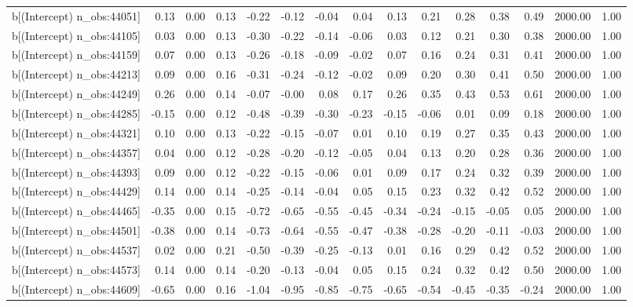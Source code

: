 \begin{table}[ht]
\begin{tabular}{rrrrrrrrrrrrrrr}
  b[(Intercept) n\_obs:44051] & 0.13 & 0.00 & 0.13 & -0.22 & -0.12 & -0.04 & 0.04 & 0.13 & 0.21 & 0.28 & 0.38 & 0.49 & 2000.00 & 1.00 \\ 
  b[(Intercept) n\_obs:44105] & 0.03 & 0.00 & 0.13 & -0.30 & -0.22 & -0.14 & -0.06 & 0.03 & 0.12 & 0.21 & 0.30 & 0.38 & 2000.00 & 1.00 \\ 
  b[(Intercept) n\_obs:44159] & 0.07 & 0.00 & 0.13 & -0.26 & -0.18 & -0.09 & -0.02 & 0.07 & 0.16 & 0.24 & 0.31 & 0.41 & 2000.00 & 1.00 \\ 
  b[(Intercept) n\_obs:44213] & 0.09 & 0.00 & 0.16 & -0.31 & -0.24 & -0.12 & -0.02 & 0.09 & 0.20 & 0.30 & 0.41 & 0.50 & 2000.00 & 1.00 \\ 
  b[(Intercept) n\_obs:44249] & 0.26 & 0.00 & 0.14 & -0.07 & -0.00 & 0.08 & 0.17 & 0.26 & 0.35 & 0.43 & 0.53 & 0.61 & 2000.00 & 1.00 \\ 
  b[(Intercept) n\_obs:44285] & -0.15 & 0.00 & 0.12 & -0.48 & -0.39 & -0.30 & -0.23 & -0.15 & -0.06 & 0.01 & 0.09 & 0.18 & 2000.00 & 1.00 \\ 
  b[(Intercept) n\_obs:44321] & 0.10 & 0.00 & 0.13 & -0.22 & -0.15 & -0.07 & 0.01 & 0.10 & 0.19 & 0.27 & 0.35 & 0.43 & 2000.00 & 1.00 \\ 
  b[(Intercept) n\_obs:44357] & 0.04 & 0.00 & 0.12 & -0.28 & -0.20 & -0.12 & -0.05 & 0.04 & 0.13 & 0.20 & 0.28 & 0.36 & 2000.00 & 1.00 \\ 
  b[(Intercept) n\_obs:44393] & 0.09 & 0.00 & 0.12 & -0.22 & -0.15 & -0.06 & 0.01 & 0.09 & 0.17 & 0.24 & 0.32 & 0.39 & 2000.00 & 1.00 \\ 
  b[(Intercept) n\_obs:44429] & 0.14 & 0.00 & 0.14 & -0.25 & -0.14 & -0.04 & 0.05 & 0.15 & 0.23 & 0.32 & 0.42 & 0.52 & 2000.00 & 1.00 \\ 
  b[(Intercept) n\_obs:44465] & -0.35 & 0.00 & 0.15 & -0.72 & -0.65 & -0.55 & -0.45 & -0.34 & -0.24 & -0.15 & -0.05 & 0.05 & 2000.00 & 1.00 \\ 
  b[(Intercept) n\_obs:44501] & -0.38 & 0.00 & 0.14 & -0.73 & -0.64 & -0.55 & -0.47 & -0.38 & -0.28 & -0.20 & -0.11 & -0.03 & 2000.00 & 1.00 \\ 
  b[(Intercept) n\_obs:44537] & 0.02 & 0.00 & 0.21 & -0.50 & -0.39 & -0.25 & -0.13 & 0.01 & 0.16 & 0.29 & 0.42 & 0.52 & 2000.00 & 1.00 \\ 
  b[(Intercept) n\_obs:44573] & 0.14 & 0.00 & 0.14 & -0.20 & -0.13 & -0.04 & 0.05 & 0.15 & 0.24 & 0.32 & 0.42 & 0.50 & 2000.00 & 1.00 \\ 
  b[(Intercept) n\_obs:44609] & -0.65 & 0.00 & 0.16 & -1.04 & -0.95 & -0.85 & -0.75 & -0.65 & -0.54 & -0.45 & -0.35 & -0.24 & 2000.00 & 1.00 \\ 

\end{tabular}
\end{table}
